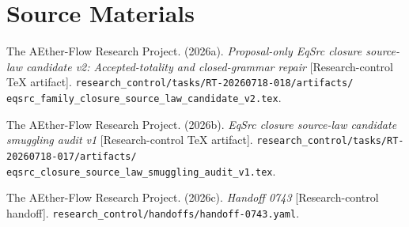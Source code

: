 \documentclass[11pt]{article}
\begin{document}
\section{Source Materials}

The AEther-Flow Research Project. (2026a). \emph{Proposal-only EqSrc closure
source-law candidate v2: Accepted-totality and closed-grammar repair}
[Research-control TeX artifact].
\texttt{research\_control/tasks/RT-20260718-018/artifacts/
eqsrc\_family\_closure\_source\_law\_candidate\_v2.tex}.

The AEther-Flow Research Project. (2026b). \emph{EqSrc closure source-law
candidate smuggling audit v1} [Research-control TeX artifact].
\texttt{research\_control/tasks/RT-20260718-017/artifacts/
eqsrc\_closure\_source\_law\_smuggling\_audit\_v1.tex}.

The AEther-Flow Research Project. (2026c). \emph{Handoff 0743}
[Research-control handoff].
\texttt{research\_control/handoffs/handoff-0743.yaml}.
\end{document}
